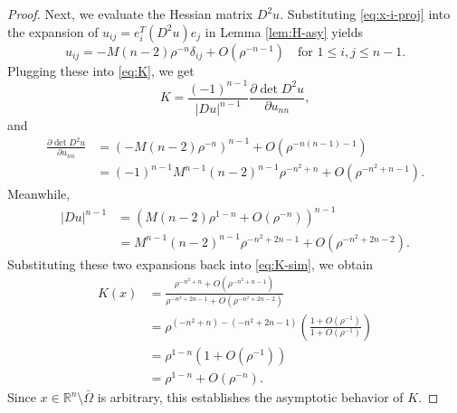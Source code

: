 \documentclass[reqno]{amsart}
\theoremstyle{remark}
\theoremstyle{definition}
\numberwithin{equation}{section}
\begin{document}
\begin{proof}
	Next, we evaluate the Hessian matrix $D^2 u$. Substituting \eqref{eq:x-i-proj} into the expansion of $u_{ij} = e_i^T(D^2 u) e_j$ in Lemma \ref{lem:H-asy} yields
	$$u_{ij} = -M(n-2)\rho^{-n} \delta_{ij} + O(\rho^{-n-1}) \quad \text{for } 1 \le i, j \le n-1.$$
	Plugging these into \eqref{eq:K}, we get
	\begin{equation}\label{eq:K-sim}
		K = \frac{(-1)^{n-1}}{|D u|^{n-1}} \frac{\partial \det D^2u}{\partial u_{nn}},
	\end{equation}
	and
	\begin{equation*}
		\begin{split}
			\frac{\partial \det D^2u}{\partial u_{nn}} & = \left( -M(n-2)\rho^{-n} \right)^{n-1} + O(\rho^{-n(n-1)-1}) \\
			& = (-1)^{n-1} M^{n-1}(n-2)^{n-1}\rho^{-n^2+n} + O(\rho^{-n^2+n-1}).
		\end{split}
	\end{equation*}
	Meanwhile, 
	\begin{equation*}
		\begin{split}
			|D u|^{n-1} & = \left( M(n-2)\rho^{1-n} + O(\rho^{-n}) \right)^{n-1} \\
			& = M^{n-1}(n-2)^{n-1}\rho^{-n^2+2n-1} + O(\rho^{-n^2+2n-2}).
		\end{split}
	\end{equation*}
	Substituting these two expansions back into \eqref{eq:K-sim}, we obtain
	$$\begin{aligned} K(x) &= \frac{\rho^{-n^2+n} + O(\rho^{-n^2+n-1})}{\rho^{-n^2+2n-1} + O(\rho^{-n^2+2n-2})} \\ &= \rho^{(-n^2+n) - (-n^2+2n-1)} \left( \frac{1 + O(\rho^{-1})}{1 + O(\rho^{-1})} \right) \\ &= \rho^{1-n} \left( 1 + O(\rho^{-1}) \right) \\ &= \rho^{1-n} + O(\rho^{-n}). \end{aligned}$$
	Since $x \in \mathbb{R}^n\setminus\bar{\Omega}$ is arbitrary, this establishes the asymptotic behavior of $K$.
\end{proof}
\end{document}

